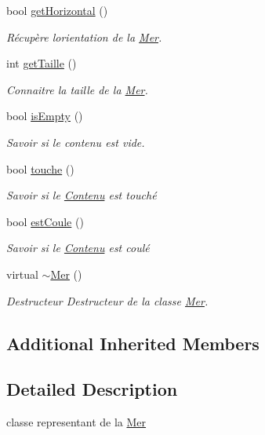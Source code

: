 \begin{DoxyCompactItemize}
bool \hyperlink{class_mer_aa2cfaf3bb10d817c535b843724759bc7}{get\+Horizontal} ()
\begin{DoxyCompactList}\small\item\em Récupère l\textquotesingle{}orientation de la \hyperlink{class_mer}{Mer}. \end{DoxyCompactList}\item 
int \hyperlink{class_mer_ad3662e679f566da98a77b585d1699a7e}{get\+Taille} ()
\begin{DoxyCompactList}\small\item\em Connaitre la taille de la \hyperlink{class_mer}{Mer}. \end{DoxyCompactList}\item 
bool \hyperlink{class_mer_ac76c2299715ae08f07e8a9fc0821b032}{is\+Empty} ()
\begin{DoxyCompactList}\small\item\em Savoir si le contenu est vide. \end{DoxyCompactList}\item 
bool \hyperlink{class_mer_a2ec6ecba14a8f737335720f3dffe9877}{touche} ()
\begin{DoxyCompactList}\small\item\em Savoir si le \hyperlink{class_contenu}{Contenu} est touché \end{DoxyCompactList}\item 
bool \hyperlink{class_mer_aa1a5b5633f2d7590e3074bf70a867ee0}{est\+Coule} ()
\begin{DoxyCompactList}\small\item\em Savoir si le \hyperlink{class_contenu}{Contenu} est coulé \end{DoxyCompactList}\item 
virtual \hyperlink{class_mer_a5c47272a53feac903046599b3c638d2c}{$\sim$\+Mer} ()\hypertarget{class_mer_a5c47272a53feac903046599b3c638d2c}{}\label{class_mer_a5c47272a53feac903046599b3c638d2c}

\begin{DoxyCompactList}\small\item\em Destructeur Destructeur de la classe \hyperlink{class_mer}{Mer}. \end{DoxyCompactList}\end{DoxyCompactItemize}
\subsection*{Additional Inherited Members}


\subsection{Detailed Description}
classe representant de la \hyperlink{class_mer}{Mer} 

